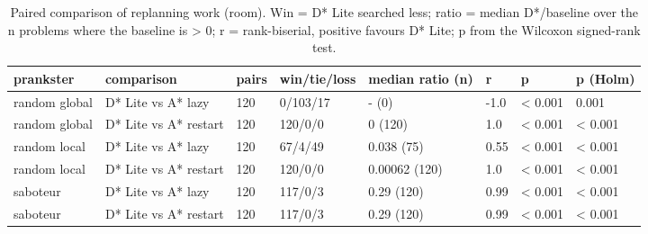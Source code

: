 \begin{table}[t]
\centering
\small
\caption{Paired comparison of replanning work (room). Win = D* Lite searched less; ratio = median D*/baseline over the n problems where the baseline is > 0; r = rank-biserial, positive favours D* Lite; p from the Wilcoxon signed-rank test.}
\label{tab:tests-replan-room}
\begin{tabular}{llllllll}
\toprule
prankster & comparison & pairs & win/tie/loss & median ratio (n) & r & p & p (Holm) \\
\midrule
random global & D* Lite vs A* lazy & 120 & 0/103/17 & - (0) & -1.0 & < 0.001 & 0.001 \\
random global & D* Lite vs A* restart & 120 & 120/0/0 & 0 (120) & 1.0 & < 0.001 & < 0.001 \\
random local & D* Lite vs A* lazy & 120 & 67/4/49 & 0.038 (75) & 0.55 & < 0.001 & < 0.001 \\
random local & D* Lite vs A* restart & 120 & 120/0/0 & 0.00062 (120) & 1.0 & < 0.001 & < 0.001 \\
saboteur & D* Lite vs A* lazy & 120 & 117/0/3 & 0.29 (120) & 0.99 & < 0.001 & < 0.001 \\
saboteur & D* Lite vs A* restart & 120 & 117/0/3 & 0.29 (120) & 0.99 & < 0.001 & < 0.001 \\
\bottomrule
\end{tabular}
\end{table}
